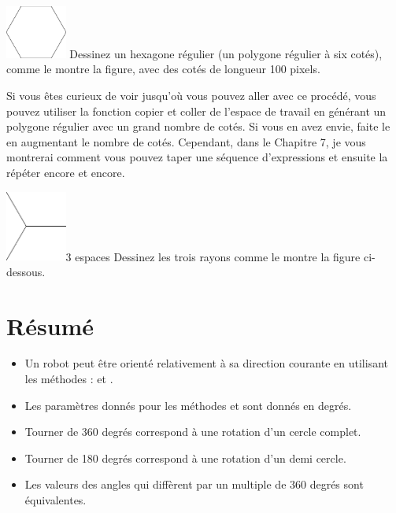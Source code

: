 \documentclass[a4paper,10pt,twoside]{book}
\begin{document}
\begin{exofigwithsize}[0.5]{\includegraphics[width=2cm]{ChTurnhexagon}}{}\label{xp:hexagon}
	Dessinez un hexagone r\'egulier (un polygone r\'egulier \`a six cot\'es), comme le montre la figure, avec des cot\'es de longueur 100 pixels.
\end{exofigwithsize}

Si vous \^etes curieux de voir jusqu'où vous pouvez aller avec ce proc\'ed\'e, vous pouvez utiliser la fonction 
copier et coller de l'espace de travail en g\'en\'erant un polygone r\'egulier avec un grand nombre de cot\'es. 
Si vous en avez envie, faite le en augmentant le nombre de cot\'es. Cependant, dans le Chapitre 7, je vous 
montrerai comment vous pouvez taper une s\'equence d'expressions et ensuite la r\'ep\'eter encore et encore.

\begin{exofigwithsize}[0.5]{\includegraphics[width=2cm]{ChTurnc3pace}}{3 espaces}\label{xp:threespokedfig}
Dessinez les trois rayons comme le montre la figure ci-dessous. 
\end{exofigwithsize}


\section{R\'esum\'e}

\begin{itemize}
\item Un robot peut \^etre orient\'e relativement \`a sa direction courante en utilisant les m\'ethodes : 
et . 
\item Les param\`etres donn\'es pour les m\'ethodes  et  sont donn\'es en degr\'es. 
\item Tourner de 360 degr\'es correspond \`a une rotation d'un cercle complet.
\item Tourner de 180 degr\'es correspond \`a une rotation d'un demi cercle. 
\item Les valeurs des angles qui diff\`erent par un multiple de 360 degr\'es sont \'equivalentes.
\end{itemize}
\end{document}

